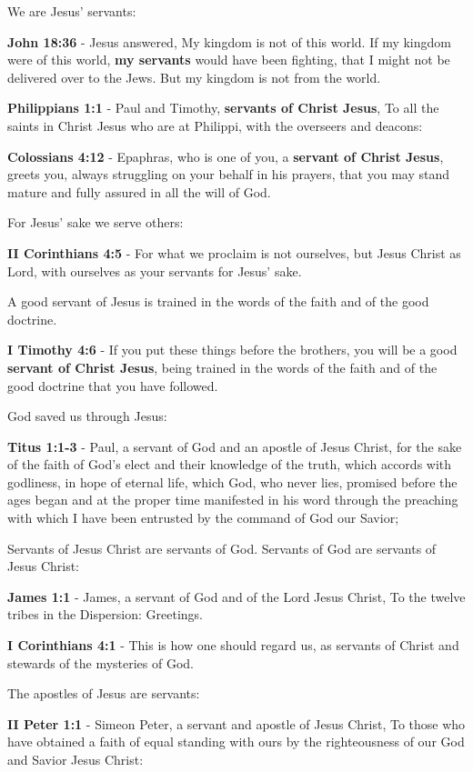 \documentclass[11pt]{article}
\begin{document}
We are Jesus' servants:

\textbf{John 18:36} - Jesus answered, My kingdom is not of this world. If my kingdom were of this world, \textbf{my servants} would have been fighting, that I might not be delivered over to the Jews. But my kingdom is not from the world.

\textbf{Philippians 1:1} - Paul and Timothy, \textbf{servants of Christ Jesus}, To all the saints in Christ Jesus who are at Philippi, with the overseers and deacons:

\textbf{Colossians 4:12} - Epaphras, who is one of you, a \textbf{servant of Christ Jesus}, greets you, always struggling on your behalf in his prayers, that you may stand mature and fully assured in all the will of God.

For Jesus' sake we serve others:

\textbf{II Corinthians 4:5} - For what we proclaim is not ourselves, but Jesus Christ as Lord, with ourselves as your servants for Jesus' sake.

A good servant of Jesus is trained in the words of the faith and of the good doctrine.

\textbf{I Timothy 4:6} - If you put these things before the brothers, you will be a good \textbf{servant of Christ Jesus}, being trained in the words of the faith and of the good doctrine that you have followed.

God saved us through Jesus:

\textbf{Titus 1:1-3} - Paul, a servant of God and an apostle of Jesus Christ, for the sake of the faith of God's elect and their knowledge of the truth, which accords with godliness, in hope of eternal life, which God, who never lies, promised before the ages began and at the proper time manifested in his word through the preaching with which I have been entrusted by the command of God our Savior;

Servants of Jesus Christ are servants of God. Servants of God are servants of Jesus Christ:

\textbf{James 1:1} - James, a servant of God and of the Lord Jesus Christ, To the twelve tribes in the Dispersion: Greetings.

\textbf{I Corinthians 4:1} - This is how one should regard us, as servants of Christ and stewards of the mysteries of God.

The apostles of Jesus are servants:

\textbf{II Peter 1:1} - Simeon Peter, a servant and apostle of Jesus Christ, To those who have obtained a faith of equal standing with ours by the righteousness of our God and Savior Jesus Christ:
\end{document}
